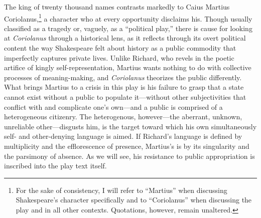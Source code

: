The king of twenty thousand names contrasts markedly to Caius Martius Coriolanus,\footnote{For the sake of consistency, I will refer to ``Martius'' when discussing Shakespeare's character specifically and to ``Coriolanus'' when discussing the play and in all other contexts.
Quotations, however, remain unaltered.} a character who at every opportunity disclaims his.
Though usually classified as a tragedy or, vaguely, as a ``political play,'' there is cause for looking at \emph{Coriolanus} through a historical lens, as it reflects through its overt political content the way Shakespeare felt about history as a public commodity that imperfectly captures private lives.
Unlike Richard, who revels in the poetic artifice of kingly self-representation, Martius wants nothing to do with collective processes of meaning-making, and \emph{Coriolanus} theorizes the public differently.
What brings Martius to a crisis in this play is his failure to grasp that a state cannot exist without a public to populate it---without other subjectivities that conflict with and complicate one's own---and a public is comprised of a heterogeneous citizenry.
The heterogenous, however---the aberrant, unknown, unreliable other---disgusts him, is the target toward which his own simultaneously self- and other-denying language is aimed.
If Richard's language is defined by multiplicity and the efflorescence of presence, Martius's is by its singularity and the parsimony of absence.
As we will see, his resistance to public appropriation is inscribed into the play text itself.


